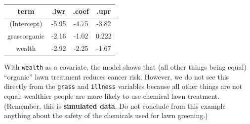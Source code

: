 \documentclass[
  letterpaper,
  DIV=11,
  numbers=noendperiod,
  oneside]{scrartcl}
\begin{document}
\begin{longtable}[]{@{}cccc@{}}
\toprule\noalign{}
term & .lwr & .coef & .upr \\
\midrule\noalign{}
\endhead
\bottomrule\noalign{}
\endlastfoot
(Intercept) & -5.95 & -4.75 & -3.82 \\
grassorganic & -2.16 & -1.02 & 0.222 \\
wealth & -2.92 & -2.25 & -1.67 \\
\end{longtable}

With \texttt{wealth} as a covariate, the model shows that (all other
things being equal) ``organic'' lawn treatment reduces cancer risk.
However, we do not see this directly from the \texttt{grass} and
\texttt{illness} variables because all other things are not equal:
wealthier people are more likely to use chemical lawn treatment.
(Remember, this is \textbf{simulated data}. Do not conclude from this
example anything about the safety of the chemicals used for lawn
greening.)
\end{document}
